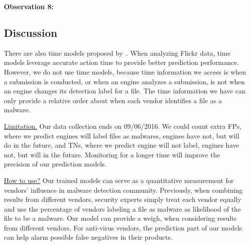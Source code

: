 {\bf Observation 8:} 
{\em {}}

\subsection{Discussion}

There are also time models proposed by~\citet{Influence}.
When analyzing Flickr data, time models leverage accurate action time to provide better prediction performance. 
However, we do not use time models, 
because time information we access is when a submission is conducted, 
or when an engine analyzes a submission, 
is not when an engine changes its detection label for a file.
The time information we have can only provide a relative order about when each vendor identifies a file as a malware.  

\underline{Limitation.}
Our data collection ends on 09/06/2016. 
We could count extra FPs, where we predict engines will label files as malwares, engines have not, but will do in the future, 
and TNs, where we predict engine will not label, engines have not, but will in the future. 
Monitoring \vt for a longer time will improve the precision of our prediction models. 

\underline{How to use?}
Our trained models can serve as 
a quantitative measurement for vendors’ influence in malware detection community. 
Previously, when combining results from different vendors, 
security experts simply treat each vendor equally and use the percentage of 
vendors labeling a file as malware as likelihood of the file to be a malware. 
Our model can provide a weigh, when considering results from different vendors.  
For anti-virus vendors, the prediction part of our models can help alarm possible false negatives in their products.
